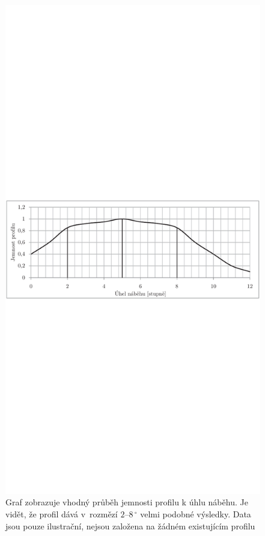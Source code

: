 \begin{figure}[H]
	\centering
	\includegraphics[]{obrazky/grafy/jemnost1p}
	\caption{Graf zobrazuje vhodný průběh jemnosti profilu k úhlu náběhu. Je vidět, že profil dává v~rozmězí $2$–$8\,^{\circ}$ velmi podobné výsledky. Data jsou pouze ilustrační, nejsou založena na žádném existujícím profilu}
	\label{graf.jemnost1}
\end{figure}

